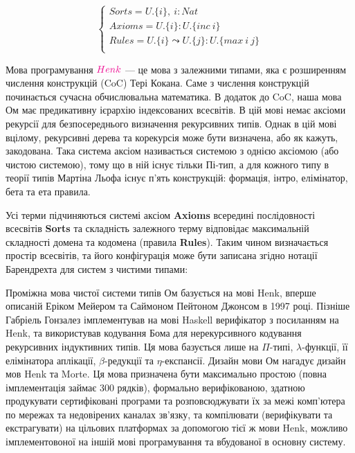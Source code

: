 \begin{equation}
\begin{cases}
Sorts = U.\{i\},\ i : Nat\\
Axioms = U.\{i\} : U.\{inc\ i\}\\
Rules = U.\{i\} \leadsto U.\{j\} : U.\{max\ i\ j\}\\
\end{cases}
\end{equation}

Мова програмування $\textcolor{magenta}{Henk}$ --- це мова з залежними типами, яка є розширенням
числення конструкцій (CoC) Тері Кокана. Саме з числення
конструкцій починається сучасна обчислювальна математика. В додаток до CoC,
наша мова Ом має предикативну ієрархію індексованих всесвітів. В цій мові немає
аксіоми рекурсії для безпосереднього визначення рекурсивних типів. Однак в цій мові
вцілому, рекурсивні дерева та корекурсія може бути визначена, або як кажуть, закодована.
Така система аксіом називається системою з однією аксіомою (або чистою системою), тому що в ній
існує тільки Пі-тип, а для кожного типу в теорії типів Мартіна Льофа існує п'ять
конструкцій: формація, інтро, елімінатор, бета та ета правила.

Усі терми підчиняються системі аксіом \textbf{Axioms} всередині
послідовності всесвітів \textbf{Sorts} та складність залежного
терму відповідає максимальній складності домена та кодомена
(правила \textbf{Rules}). Таким чином визначається простір всесвітів,
та його конфігурація може бути записана згідно нотації
Барендрехта для систем з чистими типами:

Проміжна мова чистої системи типів Ом базується на мові
Henk\cite{Erik97}, вперше описаній Еріком Мейером та Саймоном Пейтоном Джонсом в 1997 році.
Пізніше Габріель Гонзалез імплементував на мові Haskell
верифікатор з посиланням на Henk, та використував кодування Бома для нерекурсивного
кодування рекурсивних індуктивних типів. Ця мова базується лише на $\Pi$-типі,
$\lambda$-функції, її елімінатора аплікації, $\beta$-редукції та $\eta$-експансії.
Дизайн мови Ом нагадує дизайн мов Henk та Morte.
Ця мова призначена бути максимально простою (повна імплементація займає 300 рядків),
формально верифікованою, здатною продукувати сертифіковані програми та
розповсюджувати їх за межі комп'ютера по мережах та недовірених каналах зв'язку,
та компілювати (верифікувати та екстрагувати) на цільових платформах за допомогою
тієї ж мови Henk, можливо імплементовоної на іншій мові програмування та вбудованої
в основну систему.

